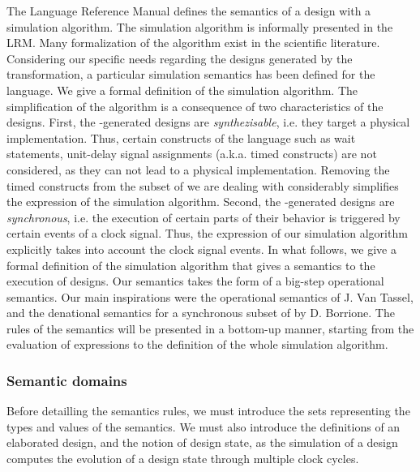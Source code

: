 The \vhdl{} Language Reference Manual\cite{VHDL2000} defines the
semantics of a \vhdl{} design with a simulation algorithm. The
simulation algorithm is informally presented in the LRM. Many
formalization of the algorithm exist in the scientific
literature\cite{Borger1995,Borrione1995,Breuer1994,Breuer1995,Breuer1995a,Deharbe1995,Dohmen1995,Fuchs1995,Goossens1995,Kloos2012,Olcoz1995,Pandey1999,Reetz1995,Shankar1997,Thirunarayan2001,VanTassel1995}. Considering
our specific needs regarding the \vhdl{} designs generated by the
\hilecop{} transformation, a particular simulation semantics has been
defined for the \hvhdl{} language. We give a formal definition of the
simulation algorithm. The simplification of the algorithm is a
consequence of two characteristics of the \hvhdl{} designs. First, the
\hilecop{}-generated \hvhdl{} designs are \textit{synthezisable},
i.e. they target a physical implementation. Thus, certain constructs
of the \vhdl{} language such as wait statements, unit-delay signal
assignments (a.k.a. timed constructs) are not considered, as they can
not lead to a physical implementation. Removing the timed constructs
from the subset of \vhdl{} we are dealing with considerably simplifies
the expression of the simulation algorithm. Second, the
\hilecop{}-generated \hvhdl{} designs are \textit{synchronous},
i.e. the execution of certain parts of their behavior is triggered by
certain events of a clock signal. Thus, the expression of our
simulation algorithm explicitly takes into account the clock signal
events. In what follows, we give a formal definition of the simulation
algorithm that gives a semantics to the execution of \hvhdl{}
designs. Our semantics takes the form of a big-step operational
semantics. Our main inspirations were the operational semantics of
J. Van Tassel\cite{VanTassel1995}, and the denational semantics for a
synchronous subset of \vhdl{} by D. Borrione\cite{Borrione1995}. The
rules of the semantics will be presented in a bottom-up manner,
starting from the evaluation of expressions to the definition of the
whole simulation algorithm.

\subsubsection{Semantic domains}
\label{subsubsec:sem-domains}

Before detailling the semantics rules, we must introduce the sets
representing the types and values of the semantics. We must also
introduce the definitions of an elaborated design, and the notion of
design state, as the simulation of a design computes the evolution of
a design state through multiple clock cycles.

